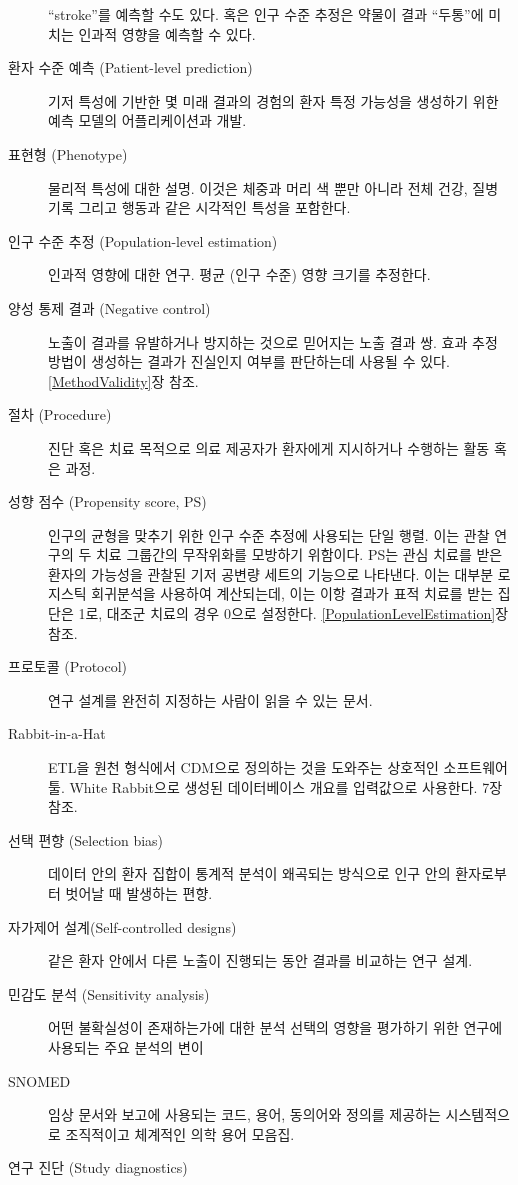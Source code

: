\documentclass[11pt]{book}
\theoremstyle{definition}
\theoremstyle{definition}
\theoremstyle{definition}
\theoremstyle{remark}
\begin{document}
\begin{description}
``stroke''를 예측할 수도 있다. 혹은 인구 수준 추정은 약물이 결과
``두통''에 미치는 인과적 영향을 예측할 수 있다.
\item[환자 수준 예측 (Patient-level prediction)]
기저 특성에 기반한 몇 미래 결과의 경험의 환자 특정 가능성을 생성하기
위한 예측 모델의 어플리케이션과 개발.
\item[표현형 (Phenotype)]
물리적 특성에 대한 설명. 이것은 체중과 머리 색 뿐만 아니라 전체 건강,
질병 기록 그리고 행동과 같은 시각적인 특성을 포함한다.
\item[인구 수준 추정 (Population-level estimation)]
인과적 영향에 대한 연구. 평균 (인구 수준) 영향 크기를 추정한다.
\item[양성 통제 결과 (Negative control)]
노출이 결과를 유발하거나 방지하는 것으로 믿어지는 노출 결과 쌍. 효과
추정 방법이 생성하는 결과가 진실인지 여부를 판단하는데 사용될 수 있다.
\ref{MethodValidity}장 참조.
\item[절차 (Procedure)]
진단 혹은 치료 목적으로 의료 제공자가 환자에게 지시하거나 수행하는 활동
혹은 과정.
\item[성향 점수 (Propensity score, PS)]
인구의 균형을 맞추기 위한 인구 수준 추정에 사용되는 단일 행렬. 이는 관찰
연구의 두 치료 그룹간의 무작위화를 모방하기 위함이다. PS는 관심 치료를
받은 환자의 가능성을 관찰된 기저 공변량 세트의 기능으로 나타낸다. 이는
대부분 로지스틱 회귀분석을 사용하여 계산되는데, 이는 이항 결과가 표적
치료를 받는 집단은 1로, 대조군 치료의 경우 0으로 설정한다.
\ref{PopulationLevelEstimation}장 참조.
\item[프로토콜 (Protocol)]
연구 설계를 완전히 지정하는 사람이 읽을 수 있는 문서.
\item[Rabbit-in-a-Hat]
ETL을 원천 형식에서 CDM으로 정의하는 것을 도와주는 상호적인 소프트웨어
툴. White Rabbit으로 생성된 데이터베이스 개요를 입력값으로 사용한다. 7장
참조.
\item[선택 편향 (Selection bias)]
데이터 안의 환자 집합이 통계적 분석이 왜곡되는 방식으로 인구 안의
환자로부터 벗어날 때 발생하는 편향.
\item[자가제어 설계(Self-controlled designs)]
같은 환자 안에서 다른 노출이 진행되는 동안 결과를 비교하는 연구 설계.
\item[민감도 분석 (Sensitivity analysis)]
어떤 불확실성이 존재하는가에 대한 분석 선택의 영향을 평가하기 위한
연구에 사용되는 주요 분석의 변이
\item[SNOMED]
임상 문서와 보고에 사용되는 코드, 용어, 동의어와 정의를 제공하는
시스템적으로 조직적이고 체계적인 의학 용어 모음집.
\item[연구 진단 (Study diagnostics)]

\end{description}
\end{document}

